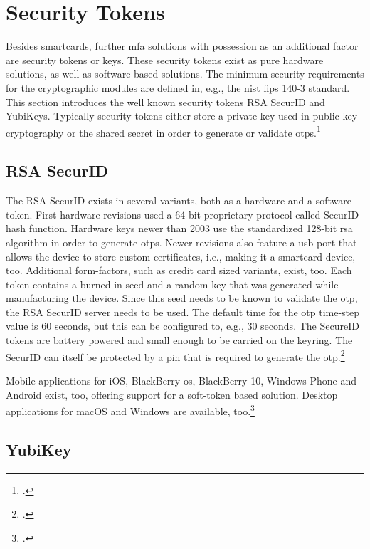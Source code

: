 \section{Security Tokens}

Besides smartcards, further \gls{mfa} solutions with possession as an additional factor are security tokens or keys. These security tokens exist as pure hardware solutions, as well as software based solutions. The minimum security requirements for the cryptographic modules are defined in, e.g., the \gls{nist} \gls{fips} 140-3 standard. This section introduces the well known security tokens \frqq RSA SecurID\flqq{} and \frqq YubiKeys\flqq. Typically security tokens either store a private key used in public-key cryptography or the shared secret in order to generate or validate \glspl{otp}.\footcites[See][]{FIPS140-3}[See][Chapter 28.4.3]{1174011}

\subsection{RSA SecurID}

The RSA SecurID exists in several variants, both as a hardware and a software token. First hardware revisions used a 64-bit proprietary protocol called \frqq SecurID hash function\flqq. Hardware keys newer than 2003 use the standardized 128-bit \gls{rsa} algorithm in order to generate \glspl{otp}. Newer revisions also feature a \gls{usb} port that allows the device to store custom certificates, i.e., making it a smartcard device, too. Additional form-factors, such as credit card sized variants, exist, too. Each token contains a burned in seed and a random key that was generated while manufacturing the device. Since this seed needs to be known to validate the \gls{otp}, the RSA SecurID server needs to be used. The default time for the \gls{otp} time-step value is 60 seconds, but this can be configured to, e.g., 30 seconds. The SecureID tokens are battery powered and small enough to be carried on the keyring. The SecurID can itself be protected by a \gls{pin} that is required to generate the \gls{otp}.\footcites[See][479--480]{eckert-it-sec-9}[See][296]{4351500}

Mobile applications for iOS, BlackBerry \gls{os}, BlackBerry 10, Windows Phone and Android exist, too, offering support for a soft-token based solution. Desktop applications for macOS and Windows are available, too.\footcites[See][3--6]{ibm-mfa}[See][49]{5542954}

\subsection{YubiKey}

